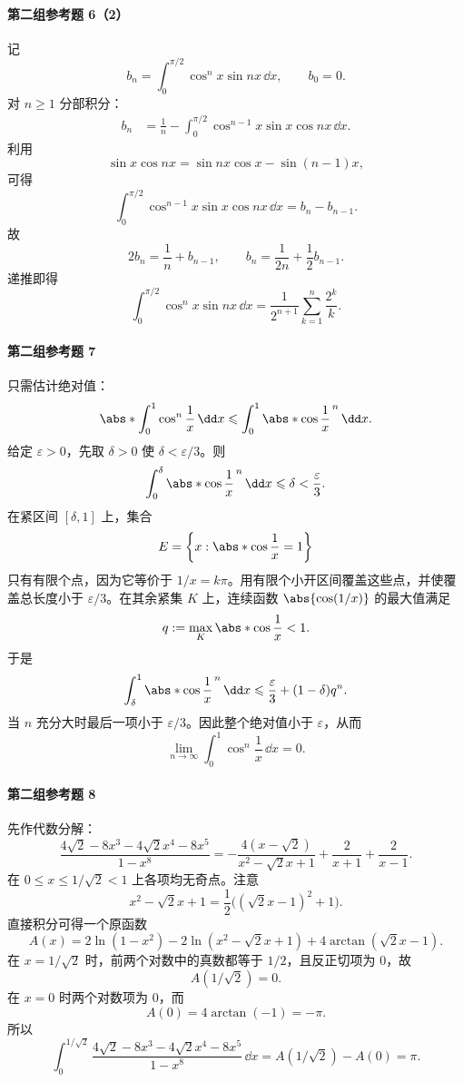 \paragraph{第二组参考题 6（2）}
\begin{xsolution}
记
\[
  b_n=\int_0^{\pi/2}\cos^n x\sin nx\,\dd x,
  \qquad b_0=0.
\]
对 $n\geqslant1$ 分部积分：
\begin{align*}
  b_n
  &=\frac1n-\int_0^{\pi/2}\cos^{n-1}x\sin x\cos nx\,\dd x.
\end{align*}
利用
\[
  \sin x\cos nx=\sin nx\cos x-\sin(n-1)x,
\]
可得
\[
  \int_0^{\pi/2}\cos^{n-1}x\sin x\cos nx\,\dd x
  =b_n-b_{n-1}.
\]
故
\[
  2b_n=\frac1n+b_{n-1},
  \qquad
  b_n=\frac1{2n}+\frac12b_{n-1}.
\]
递推即得
\[
  \boxed{
  \int_0^{\pi/2}\cos^n x\sin nx\,\dd x
  =\frac1{2^{n+1}}\sum_{k=1}^n\frac{2^k}{k}}.
\]
\end{xsolution}

\paragraph{第二组参考题 7}
\begin{xsolution}
只需估计绝对值：
\[
  \abs*{\int_0^1\cos^n\frac1x\,\dd x}
  \leqslant\int_0^1\abs*{\cos\frac1x}^{\,n}\,\dd x.
\]
给定 $\varepsilon>0$，先取 $\delta>0$ 使 $\delta<\varepsilon/3$。则
\[
  \int_0^\delta\abs*{\cos\frac1x}^{\,n}\,\dd x\leqslant\delta<\frac\varepsilon3.
\]
在紧区间 $[\delta,1]$ 上，集合
\[
  E=\left\{x:\abs*{\cos\frac1x}=1\right\}
\]
只有有限个点，因为它等价于 $1/x=k\pi$。用有限个小开区间覆盖这些点，并使覆盖总长度小于 $\varepsilon/3$。在其余紧集 $K$ 上，连续函数 $\abs{\cos(1/x)}$ 的最大值满足
\[
  q:=\max_K\abs*{\cos\frac1x}<1.
\]
于是
\[
  \int_\delta^1\abs*{\cos\frac1x}^{\,n}\,\dd x
  \leqslant\frac\varepsilon3+(1-\delta)q^n.
\]
当 $n$ 充分大时最后一项小于 $\varepsilon/3$。因此整个绝对值小于 $\varepsilon$，从而
\[
  \boxed{\lim_{n\to\infty}\int_0^1\cos^n\frac1x\,\dd x=0}.
\]
\end{xsolution}

\paragraph{第二组参考题 8}
\begin{xsolution}
先作代数分解：
\[
  \frac{4\sqrt2-8x^3-4\sqrt2x^4-8x^5}{1-x^8}
  =-\frac{4(x-\sqrt2)}{x^2-\sqrt2x+1}
  +\frac2{x+1}+\frac2{x-1}.
\]
在 $0\leqslant x\leqslant1/\sqrt2<1$ 上各项均无奇点。注意
\[
  x^2-\sqrt2x+1
  =\frac12\bigl((\sqrt2x-1)^2+1\bigr).
\]
直接积分可得一个原函数
\[
  A(x)=2\ln(1-x^2)
  -2\ln(x^2-\sqrt2x+1)
  +4\arctan(\sqrt2x-1).
\]
在 $x=1/\sqrt2$ 时，前两个对数中的真数都等于 $1/2$，且反正切项为 $0$，故
\[
  A(1/\sqrt2)=0.
\]
在 $x=0$ 时两个对数项为 $0$，而
\[
  A(0)=4\arctan(-1)=-\pi.
\]
所以
\[
  \boxed{
  \int_0^{1/\sqrt2}
  \frac{4\sqrt2-8x^3-4\sqrt2x^4-8x^5}{1-x^8}\,\dd x
  =A(1/\sqrt2)-A(0)=\pi}.
\]
\end{xsolution}
